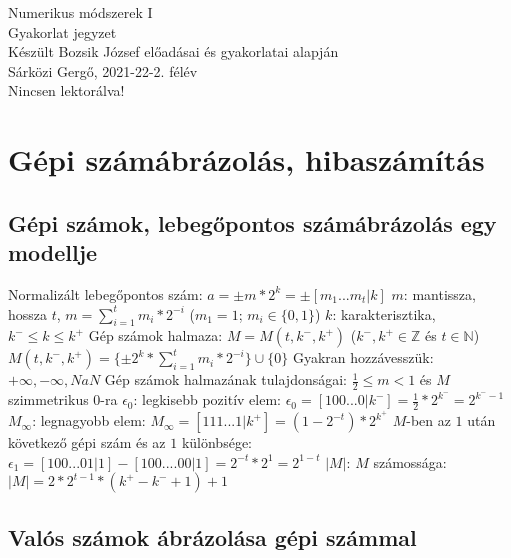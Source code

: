 \documentclass[12pt,a4paper]{article}
\begin{document}
\begin{center}
	\huge
	Numerikus módszerek I\\
	\vspace{1mm}
	\LARGE
	Gyakorlat jegyzet\\
	\vspace{5mm}
	\large
	Készült Bozsik József előadásai és gyakorlatai alapján\\
	\vspace{5mm}
	Sárközi Gergő, 2021-22-2. félév\\
	Nincsen lektorálva!
\end{center}

\tableofcontents

\pagebreak

\section{Gépi számábrázolás, hibaszámítás}

\subsection{Gépi számok, lebegőpontos számábrázolás egy modellje}

\begin{outline}
	\1 Normalizált lebegőpontos szám: $a = \pm m * 2^k = \pm [m_1 ... m_t | k]$
		\2 $m$: mantissza, hossza $t$, $m=\sum_{i=1}^{t} m_i*2^{-i}$ \; ($m_1=1$; $m_i \in \{0,1\}$)
		\2 $k$: karakterisztika, $k^- \le k \le k^+$
	\1 Gép számok halmaza: $M=M(t,k^-,k^+)$ \; ($k^-,k^+ \in \mathbb{Z}$ és $t \in \mathbb{N}$)
		\2 $M(t,k^-,k^+) = \{\pm 2^k * \sum_{i=1}^{t} m_i * 2^{-i} \} \cup \{0\}$
		\2 Gyakran hozzávesszük: $+\infty, -\infty, NaN$
	\1 Gép számok halmazának tulajdonságai:
		\2 $\frac{1}{2} \le m < 1$ \; és \; $M$ szimmetrikus 0-ra
		\2 $\epsilon_0$: legkisebb pozitív elem: $\epsilon_0 = [100...0|k^-] = \frac{1}{2} * 2^{k^-} = 2^{k^- - 1}$
		\2 $M_\infty$: legnagyobb elem: $M_\infty = [111...1|k^+] = (1-2^{-t}) * 2^{k^+}$
		\2 $M$-ben az $1$ után következő gépi szám és az $1$ különbsége:\\
		$\epsilon_1 = [100...01|1] - [100....00|1] = 2^{-t} * 2^1 = 2^{1-t}$
		\2 $|M|$: $M$ számossága: $|M|=2*2^{t-1}*(k^+ - k^- + 1) + 1$
\end{outline}

\subsection{Valós számok ábrázolása gépi számmal}
\end{document}
